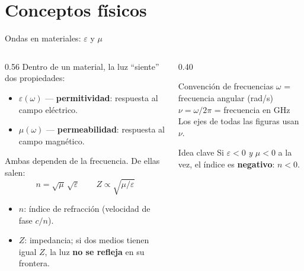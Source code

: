 \documentclass[aspectratio=169,10pt]{beamer}
\begin{document}
\section{Conceptos físicos}

\begin{frame}{Ondas en materiales: $\varepsilon$ y $\mu$}
  \small
  \begin{columns}[T]
    \begin{column}{0.56\textwidth}
      Dentro de un material, la luz ``siente'' dos propiedades:
      \begin{itemize}
        \item $\varepsilon(\omega)$ --- \textbf{permitividad}: respuesta al campo eléctrico.
        \item $\mu(\omega)$ --- \textbf{permeabilidad}: respuesta al campo magnético.
      \end{itemize}
      \vspace{0.4em}
      Ambas dependen de la frecuencia. De ellas salen:
      \[
        n = \sqrt{\mu}\,\sqrt{\varepsilon}
        \qquad
        Z \propto \sqrt{\mu/\varepsilon}
      \]
      \begin{itemize}
        \item $n$: índice de refracción (velocidad de fase $c/n$).
        \item $Z$: impedancia; si dos medios tienen igual $Z$, la luz \textbf{no se refleja} en su frontera.
      \end{itemize}
    \end{column}
    \begin{column}{0.40\textwidth}
      \begin{block}{Convención de frecuencias}
        $\omega$ = frecuencia angular (rad/s)\\[0.2em]
        $\nu = \omega/2\pi$ = frecuencia en GHz\\[0.2em]
        Los ejes de todas las figuras usan $\nu$.
      \end{block}
      \begin{alertblock}{Idea clave}
        Si $\varepsilon<0$ \emph{y} $\mu<0$ a la vez, el índice es \textbf{negativo}: $n<0$.
      \end{alertblock}
    \end{column}
  \end{columns}
\end{frame}
\end{document}
